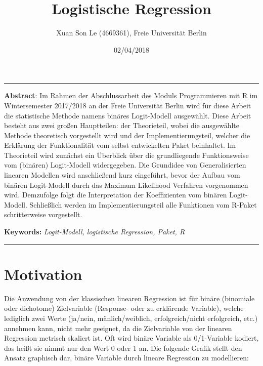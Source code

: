 \documentclass[12pt,]{article}
\title{\textbf{Logistische Regression}}
\author{Xuan Son Le (4669361), Freie Universität Berlin}
\date{02/04/2018}
\begin{document}
\maketitle

\begin{center}\rule{0.5\linewidth}{\linethickness}\end{center}

\textbf{Abstract}: Im Rahmen der Abschlussarbeit des Moduls
Programmieren mit R im Wintersemester 2017/2018 an der Freie Universität
Berlin wird für diese Arbeit die statistische Methode namens binäres
Logit-Modell ausgewählt. Diese Arbeit besteht aus zwei großen
Hauptteilen: der Theorieteil, wobei die ausgewählte Methode theoretisch
vorgestellt wird und der Implementierungsteil, welcher die Erklärung der
Funktionalität vom selbst entwickelten Paket beinhaltet. Im Theorieteil
wird zunächst ein Überblick über die grundliegende Funktionsweise vom
(binären) Logit-Modell widergegeben. Die Grundidee von Generalisierten
linearen Modellen wird anschließend kurz eingeführt, bevor der Aufbau
vom binären Logit-Modell durch das Maximum Likelihood Verfahren
vorgenommen wird. Demzufolge folgt die Interpretation der Koeffizienten
vom binären Logit-Modell. Schließlich werden im Implementierungsteil
alle Funktionen vom R-Paket schritterweise vorgestellt.

\textbf{Keywords:} \emph{Logit-Modell, logistische Regression, Paket, R}

\begin{center}\rule{0.5\linewidth}{\linethickness}\end{center}

\newpage

\section{Motivation}\label{motivation}

Die Anwendung von der klassischen linearen Regression ist für binäre
(binomiale oder dichotome) Zielvariable (Response- oder zu erklärende
Variable), welche lediglich zwei Werte (ja/nein, mänlich/weiblich,
erfolgreich/nicht erfolgreich, etc.) annehmen kann, nicht mehr geeignet,
da die Zielvariable von der linearen Regression metrisch skaliert ist.
Oft wird binäre Variable als 0/1-Variable kodiert, das heißt sie nimmt
nur den Wert 0 oder 1 an. Die folgende Grafik stellt den Ansatz
graphisch dar, binäre Variable durch lineare Regression zu modellieren:
\end{document}
